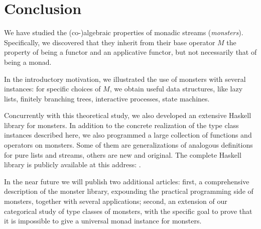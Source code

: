 \section{Conclusion}

We have studied the (co-)algebraic properties of monadic streams ({\em monsters}).
Specifically, we discovered that they inherit from their base operator $M$ the property of being a functor and an applicative functor, but not necessarily that of being a monad.

In the introductory motivation, we illustrated the use of monsters with several instances: for specific choices of $M$, we obtain useful data structures, like lazy lists, finitely branching trees, interactive processes, state machines.

Concurrently with this theoretical study, we also developed an extensive Haskell library for monsters.
In addition to the concrete realization of the type class instances described here, we also programmed a large collection of functions and operators on monsters.
Some of them are generalizations of analogous definitions for pure lists and streams, others are new and original.
The complete Haskell library is publicly available at this address: \repourl.

In the near future we will publish two additional articles:
first, a comprehensive description of the monster library, expounding the practical programming side of monsters, together with several applications;
second, an extension of our categorical study of type classes of monsters, with the specific goal to prove that it is impossible to give a universal monad instance for monsters.
